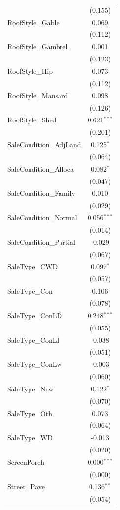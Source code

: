 \begin{table}[!htbp]
\begin{tabular}{@{\extracolsep{5pt}}lc}
& (0.155) \\
 RoofStyle\_Gable & 0.069$^{}$ \\
& (0.112) \\
 RoofStyle\_Gambrel & 0.001$^{}$ \\
& (0.123) \\
 RoofStyle\_Hip & 0.073$^{}$ \\
& (0.112) \\
 RoofStyle\_Mansard & 0.098$^{}$ \\
& (0.126) \\
 RoofStyle\_Shed & 0.621$^{***}$ \\
& (0.201) \\
 SaleCondition\_AdjLand & 0.125$^{*}$ \\
& (0.064) \\
 SaleCondition\_Alloca & 0.082$^{*}$ \\
& (0.047) \\
 SaleCondition\_Family & 0.010$^{}$ \\
& (0.029) \\
 SaleCondition\_Normal & 0.056$^{***}$ \\
& (0.014) \\
 SaleCondition\_Partial & -0.029$^{}$ \\
& (0.067) \\
 SaleType\_CWD & 0.097$^{*}$ \\
& (0.057) \\
 SaleType\_Con & 0.106$^{}$ \\
& (0.078) \\
 SaleType\_ConLD & 0.248$^{***}$ \\
& (0.055) \\
 SaleType\_ConLI & -0.038$^{}$ \\
& (0.051) \\
 SaleType\_ConLw & -0.003$^{}$ \\
& (0.060) \\
 SaleType\_New & 0.122$^{*}$ \\
& (0.070) \\
 SaleType\_Oth & 0.073$^{}$ \\
& (0.064) \\
 SaleType\_WD & -0.013$^{}$ \\
& (0.020) \\
 ScreenPorch & 0.000$^{***}$ \\
& (0.000) \\
 Street\_Pave & 0.136$^{**}$ \\
& (0.054) \\

\end{tabular}
\end{table}
